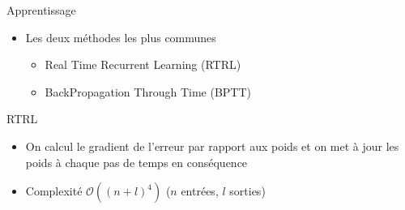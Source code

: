 \begin{frame}{Apprentissage}
	\begin{itemize}
		\item Les deux méthodes les plus communes
		\begin{itemize}
			\item Real Time Recurrent Learning (RTRL) \cite{Robinson87}
			\item BackPropagation Through Time (BPTT) \cite{Williams89}
		\end{itemize}
	\end{itemize}
\end{frame}

\begin{frame}{RTRL}

	\begin{itemize}
		\item On calcul le gradient de l'erreur par rapport aux poids et on met à jour les poids à chaque pas de temps en conséquence
        \item Complexité $\mathcal{O}\left((n+l)^4\right)$ ($n$ entrées, $l$ sorties)
	\end{itemize}
\end{frame}

